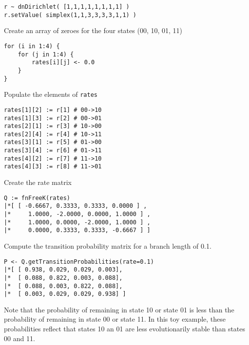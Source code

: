 {\tt \begin{snugshade*}
\begin{lstlisting}
r ~ dnDirichlet( [1,1,1,1,1,1,1,1] )
r.setValue( simplex(1,1,3,3,3,3,1,1) )
\end{lstlisting}
\end{snugshade*}}

Create an array of zeroes for the four states (00, 10, 01, 11)

{\tt \begin{snugshade*}
\begin{lstlisting}
for (i in 1:4) {
    for (j in 1:4) {
        rates[i][j] <- 0.0
    }
}
\end{lstlisting}
\end{snugshade*}}

Populate the elements of {\tt rates}

{\tt \begin{snugshade*}
\begin{lstlisting}
rates[1][2] := r[1] # 00->10
rates[1][3] := r[2] # 00->01
rates[2][1] := r[3] # 10->00
rates[2][4] := r[4] # 10->11
rates[3][1] := r[5] # 01->00
rates[3][4] := r[6] # 01->11
rates[4][2] := r[7] # 11->10
rates[4][3] := r[8] # 11->01
\end{lstlisting}
\end{snugshade*}}

Create the rate matrix

{\tt \begin{snugshade*}
\begin{lstlisting}
Q := fnFreeK(rates)
|*[ [ -0.6667, 0.3333, 0.3333, 0.0000 ] ,
|*     1.0000, -2.0000, 0.0000, 1.0000 ] ,
|*     1.0000, 0.0000, -2.0000, 1.0000 ] ,
|*     0.0000, 0.3333, 0.3333, -0.6667 ] ]
\end{lstlisting}
\end{snugshade*}}

Compute the transition probability matrix for a branch length of 0.1.

{\tt \begin{snugshade*}
\begin{lstlisting}
P <- Q.getTransitionProbabilities(rate=0.1)
|*[ [ 0.938, 0.029, 0.029, 0.003],
|*  [ 0.088, 0.822, 0.003, 0.088],
|*  [ 0.088, 0.003, 0.822, 0.088],
|*  [ 0.003, 0.029, 0.029, 0.938] ]
\end{lstlisting}
\end{snugshade*}}

Note that the probability of remaining in state 10 or state 01 is less than the probability of remaining in state 00 or state 11.
In this toy example, these probabilities reflect that states 10 an 01 are less evolutionarily stable than states 00 and 11.

